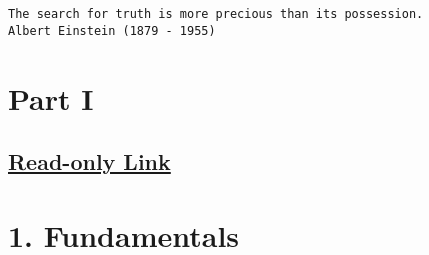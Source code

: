 \documentclass[12pt,letterpaper]{article}
\begin{document}
\begin{center}
\texttt{The search for truth is more precious than its possession.\\  Albert Einstein (1879 - 1955)}
\end{center}
\section*{\centering Part I}
\subsection*{\centering  \href{https://www.overleaf.com/read/bsjxfktnsjsw}{Read-only Link}
}

\section*{1. Fundamentals}
\end{document}

